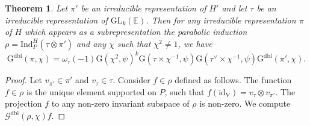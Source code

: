 \documentclass[12pt, reqno]{amsart}
\newtheorem{theorem}{Theorem}[section]
\theoremstyle{definition}
\theoremstyle{definition}
\theoremstyle{definition}
\newcommand{\idmap}{\mathrm{id}}
\newcommand{\hermitianSpace}{\mathrm{V}}
\newcommand{\fieldCharacter}{\psi}
\newcommand{\centralCharacter}[1]{\omega_{#1}}
\newcommand{\Ind}[3]{\mathrm{Ind}_{#1}^{#2}\left(#3\right)}
\newcommand{\Contragradient}[1]{#1^{\vee}}
\newcommand{\GL}{\mathrm{GL}}
\newcommand{\quadraticExtension}{\mathbb{E}}
\newcommand{\dblGaussSum}[2]{\mathcal{G}^{\mathrm{dbl}}\left(#1, #2\right)}
\newcommand{\GaussSumScalar}[2]{\mathrm{G}\left(#1, #2\right)}
\newcommand{\dblGaussSumScalar}[2]{\mathrm{G}^{\mathrm{dbl}}\left(#1, #2\right)}
\begin{document}
\begin{theorem}\label{thm:multiplicativity-in-terms-of-gauss-sums}
	Let $\pi'$ be an irreducible representation of $H'$ and let $\tau$ be an irreducible representation of $\GL_k\left(\quadraticExtension\right)$. Then for any irreducible representation $\pi$ of $H$ which appears as a subrepresentation the parabolic induction $\rho = \Ind{P}{H}{\tau \overline{\otimes} \pi'}$ and any $\chi$ such that $\chi^2 \ne 1$, we have
	$$\dblGaussSumScalar{\pi}{\chi} = \centralCharacter{\tau}\left(-1\right) \GaussSumScalar{\chi^2}{\fieldCharacter}^k \GaussSumScalar{\tau \times \chi^{-1}}{\fieldCharacter} \GaussSumScalar{\Contragradient{\tau} \times \chi^{-1}}{\fieldCharacter} \dblGaussSumScalar{\pi'}{\chi}.$$
\end{theorem}
\begin{proof}
	Let $v_{\pi'} \in \pi'$ and $v_{\tau} \in \tau$. Consider $f \in \rho$ defined as follows. The function $f \in \rho$ is the unique element supported on $P$, such that $f\left(\idmap_{\hermitianSpace}\right) = v_{\tau} \otimes v_{\pi'}$. The projection $f$ to any non-zero invariant subspace of $\rho$ is non-zero. We compute $\dblGaussSum{\rho}{\chi} f$.
	

\end{proof}
\end{document}
